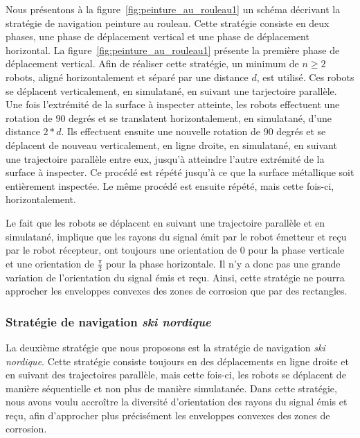 \documentclass[francais,RandD]{rapportPFE}
\begin{document}
				Nous présentons à la figure~\ref{fig:peinture_au_rouleau1} un schéma décrivant la stratégie de navigation peinture au rouleau.
				Cette stratégie consiste en deux phases, une phase de déplacement vertical et une phase de déplacement horizontal.
				La figure~\ref{fig:peinture_au_rouleau1} présente la première phase de déplacement vertical.
				Afin de réaliser cette stratégie, un minimum de $n \ge 2$ robots, aligné horizontalement et séparé par une distance $d$, est utilisé.
				Ces robots se déplacent verticalement, en simulatané, en suivant une tarjectoire parallèle.
				Une fois l'extrémité de la surface à inspecter atteinte, les robots effectuent une rotation de 90 degrés et se translatent horizontalement, en simulatané, d'une distance $2 * d$.
				Ils effectuent ensuite une nouvelle rotation de 90 degrés et se déplacent de nouveau verticalement, en ligne droite, en simulatané, en suivant une trajectoire parallèle entre eux, jusqu'à atteindre l'autre extrémité de la surface à inspecter.
				Ce procédé est répété jusqu'à ce que la surface métallique soit entièrement inspectée.
				Le même procédé est ensuite répété, mais cette fois-ci, horizontalement.

				Le fait que les robots se déplacent en suivant une trajectoire parallèle et en simulatané, implique que les rayons du signal émit par le robot émetteur et reçu par le robot récepteur, ont toujours une orientation de $0$ pour la phase verticale et une orientation de $\frac{\pi}{2}$ pour la phase horizontale.
				Il n'y a donc pas une grande variation de l'orientation du signal émis et reçu.
				Ainsi, cette stratégie ne pourra approcher les enveloppes convexes des zones de corrosion que par des rectangles.
			\subsubsection*{Stratégie de navigation \textit{ski nordique}}
				La deuxième stratégie que nous proposons est la stratégie de navigation \textit{ski nordique}.
				Cette stratégie consiste toujours en des déplacements en ligne droite et en suivant des trajectoires parallèle, mais cette fois-ci, les robots se déplacent de manière séquentielle et non plus de manière simulatanée.
				Dans cette stratégie, nous avons voulu accroître la diversité d'orientation des rayons du signal émis et reçu, afin d'approcher plus précisément les enveloppes convexes des zones de corrosion.
\end{document}
